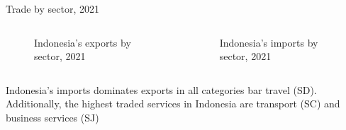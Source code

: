 \documentclass[
  ignorenonframetext,
]{beamer}
\begin{document}
\begin{frame}{Trade by sector, 2021}
\label{trade-by-sector-2021}
\begin{columns}[T]
\begin{column}{0.47\textwidth}
\begin{figure}


\caption{\label{fig-SX}Indonesia's exports by sector, 2021}

\end{figure}%
\end{column}

\begin{column}{0.47\textwidth}
\begin{figure}


\caption{\label{fig-SM}Indonesia's imports by sector, 2021}

\end{figure}%
\end{column}
\end{columns}

Indonesia's imports dominates exports in all categories bar travel (SD).
Additionally, the highest traded services in Indonesia are transport
(SC) and business services (SJ)
\end{frame}
\end{document}
